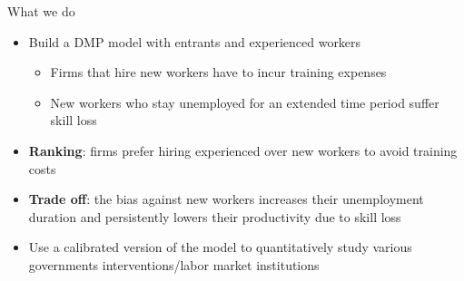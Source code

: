 \documentclass[9pt,xcolor={svgnames}]{beamer}
\begin{document}

\begin{frame}{What we do}
\begin{itemize}
\setlength\itemsep{2em}
    \item Build a DMP model with entrants and experienced workers
    \smallskip
    \begin{itemize}
    \item Firms that hire new workers have to incur training expenses
    \item New workers who stay unemployed for an extended time period suffer skill loss
    \end{itemize}


    \item \textbf{Ranking}: firms prefer hiring experienced over new workers to avoid training costs
    
    \item \textbf{Trade off}: the bias against new workers increases their unemployment duration and persistently lowers their productivity due to skill loss
    
    \item Use a calibrated version of the model to quantitatively study various governments interventions/labor market institutions
\end{itemize}
\end{frame}
\end{document}
